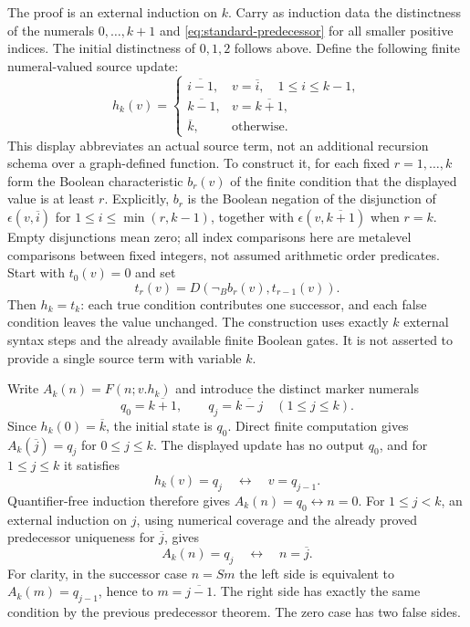 \documentclass[11pt]{article}
\theoremstyle{definition}\newtheorem{definition}[theorem]{Definition}
\begin{document}
The proof is an external induction on $k$. Carry as induction data
the distinctness of the numerals $0,\ldots,k+1$ and
\eqref{eq:standard-predecessor} for all smaller positive indices.
The initial distinctness of $0,1,2$ follows above. Define the following
finite numeral-valued source update:
\[
 h_k(v)=
 \begin{cases}
 \overline{i-1},&v=\overline{i},\quad 1\le i\le k-1,\\
 \overline{k-1},&v=\overline{k+1},\\
 \overline{k},&\text{otherwise}.
 \end{cases}
\]
This display abbreviates an actual source term, not an additional
recursion schema over a graph-defined function. To construct it,
for each fixed $r=1,\ldots,k$ form the Boolean characteristic $b_r(v)$
of the finite condition that the displayed value is at least $r$.
Explicitly, $b_r$ is the Boolean negation of the disjunction of
$\epsilon(v,\overline{i})$ for $1\le i\le\min(r,k-1)$, together
with $\epsilon(v,\overline{k+1})$ when $r=k$. Empty disjunctions
mean zero; all index comparisons here are metalevel comparisons
between fixed integers, not assumed arithmetic order predicates.
Start with $t_0(v)=0$ and set
\[
                  t_r(v)=D(\neg_B b_r(v),t_{r-1}(v)).
\]
Then $h_k=t_k$: each true condition contributes one successor, and
each false condition leaves the value unchanged. The construction
uses exactly $k$ external syntax steps and the already available
finite Boolean gates. It is not asserted to provide a single source
term with variable $k$.

Write $A_k(n)=F(n;v.h_k)$ and introduce the distinct marker numerals
\[
 q_0=\overline{k+1},\qquad q_j=\overline{k-j}\quad(1\le j\le k).
\]
Since $h_k(0)=\overline{k}$, the initial state is $q_0$. Direct finite
computation gives $A_k(\overline{j})=q_j$ for $0\le j\le k$.
The displayed update has no output $q_0$, and for $1\le j\le k$ it
satisfies
\[
                       h_k(v)=q_j\quad\longleftrightarrow\quad v=q_{j-1}.
\]
Quantifier-free induction therefore gives
$A_k(n)=q_0\leftrightarrow n=0$. For $1\le j<k$, an external
induction on $j$, using numerical coverage and the already proved
predecessor uniqueness for $\overline{j}$, gives
\[
                     A_k(n)=q_j\quad\longleftrightarrow\quad n=\overline{j}.
\]
For clarity, in the successor case $n=Sm$ the left side is equivalent
to $A_k(m)=q_{j-1}$, hence to $m=\overline{j-1}$. The right side has
exactly the same condition by the previous predecessor theorem.
The zero case has two false sides.
\end{document}
